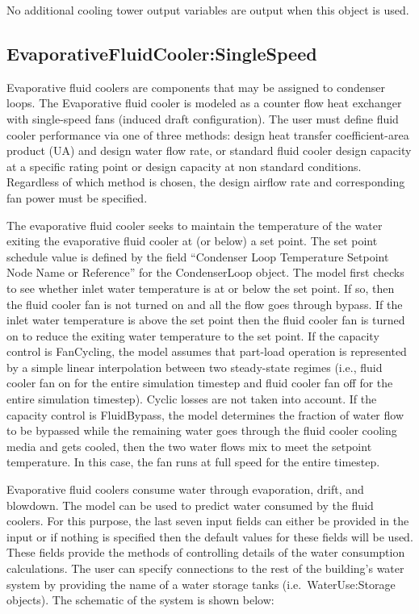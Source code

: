 No additional cooling tower output variables are output when this object is used.

\subsection{EvaporativeFluidCooler:SingleSpeed}\label{evaporativefluidcoolersinglespeed}

Evaporative fluid coolers are components that may be assigned to condenser loops. The Evaporative fluid cooler is modeled as a counter flow heat exchanger with single-speed fans (induced draft configuration). The user must define fluid cooler performance via one of three methods: design heat transfer coefficient-area product (UA) and design water flow rate, or standard fluid cooler design capacity at a specific rating point or design capacity at non standard conditions. Regardless of which method is chosen, the design airflow rate and corresponding fan power must be specified.

The evaporative fluid cooler seeks to maintain the temperature of the water exiting the evaporative fluid cooler at (or below) a set point. The set point schedule value is defined by the field ``Condenser Loop Temperature Setpoint Node Name or Reference'' for the CondenserLoop object. The model first checks to see whether inlet water temperature is at or below the set point. If so, then the fluid cooler fan is not turned on and all the flow goes through bypass. If the inlet water temperature is above the set point then the fluid cooler fan is turned on to reduce the exiting water temperature to the set point. If the capacity control is FanCycling, the model assumes that part-load operation is represented by a simple linear interpolation between two steady-state regimes (i.e., fluid cooler fan on for the entire simulation timestep and fluid cooler fan off for the entire simulation timestep). Cyclic losses are not taken into account. If the capacity control is FluidBypass, the model determines the fraction of water flow to be bypassed while the remaining water goes through the fluid cooler cooling media and gets cooled, then the two water flows mix to meet the setpoint temperature. In this case, the fan runs at full speed for the entire timestep.

Evaporative fluid coolers consume water through evaporation, drift, and blowdown. The model can be used to predict water consumed by the fluid coolers. For this purpose, the last seven input fields can either be provided in the input or if nothing is specified then the default values for these fields will be used. These fields provide the methods of controlling details of the water consumption calculations. The user can specify connections to the rest of the building's water system by providing the name of a water storage tanks (i.e.~WaterUse:Storage objects). The schematic of the system is shown below:

